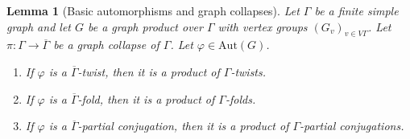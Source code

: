 \documentclass[a4paper,english,11pt]{article}
\newtheorem{lemma}[de]{Lemma}
\theoremstyle{definition}
\theoremstyle{remark}
\newcommand{\Aut}{\mathrm{Aut}}
\begin{document}
\begin{lemma}[Basic automorphisms and graph collapses]\label{Lmm:Aut-and-graph-collapse}
    Let $\Gamma$ be a finite simple graph and let $G$ be a graph product over $\Gamma$ with vertex groups $(G_v)_{v\in V\Gamma}$. Let $\pi:\Gamma \rightarrow \overline{\Gamma}$ be a graph collapse of $\Gamma$. Let $\varphi \in \Aut(G)$.
    \begin{enumerate}
        \item If $\varphi$ is a $\overline{\Gamma}$-twist, then it is a product of $\Gamma$-twists.
        \item If $\varphi$ is a $\overline{\Gamma}$-fold, then it is a product of $\Gamma$-folds.
        \item If $\varphi$ is a $\overline{\Gamma}$-partial conjugation, then it is a product of $\Gamma$-partial conjugations.
    \end{enumerate}
\end{lemma}
\end{document}
